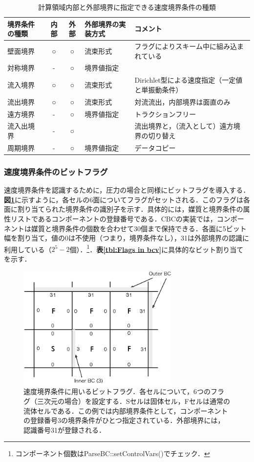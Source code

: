 \begin{table}[htdp]
\small
\caption{計算領域内部と外部境界に指定できる速度境界条件の種類}
\begin{center}
\begin{tabular}{l|cc|ll} \toprule
境界条件の種類 & 内部 & 外部 & 外部境界の実装方式 & コメント\\ \midrule
壁面境界 & ○ & ○ & 流束形式 & フラグによりスキーム中に組み込まれている\\
対称境界 & - & ○ & 境界値指定 &\\
流入境界 & ○ & ○ & 流束形式 & Dirichlet型による速度指定（一定値と単振動条件）\\
流出境界 & ○ & ○ & 流束形式 & 対流流出，内部境界は面直のみ\\
遠方境界 & - & ○ & 境界値指定 & トラクションフリー\\
流入出境界 & - & ○ &  & 流出境界と，（流入として）遠方境界の切り替え\\
周期境界 & - & ○ & 境界値指定 & データコピー\\ \bottomrule
\end{tabular}
\end{center}
\label{tbl:BCs of velocity}
\end{table}

%
\subsubsection{速度境界条件のビットフラグ}
速度境界条件を認識するために，圧力の場合と同様にビットフラグを導入する．\textbf{図\ref{fig:bit flag V}}に示すように，各セルの6面についてフラグがセットされる．このフラグは各面に割り当てられた境界条件の識別子を示す．具体的には，媒質と境界条件の属性リストであるコンポーネントの登録番号である．CBCの実装では，コンポーネントは媒質と境界条件の個数を合わせて30個まで保持できる．各面に5ビット幅を割り当て，値の0は不使用（つまり，境界条件なし），31は外部境界の認識に利用している（$2^5-2$個）．\footnote{コンポーネント個数はParseBC::setControlVars()でチェック．}．\textbf{表\ref{tbl:Flags in bcv}}に具体的なビット割り当てを示す．

\begin{figure}[htbp]
\begin{center}
\includegraphics[width=8cm,clip]{bit_flag_V.eps}
\end{center}
\caption{速度境界条件に用いるビットフラグ．各セルについて，6つのフラグ（三次元の場合）を設定する．Sセルは固体セル，Fセルは通常の流体セルである．この例では内部境界条件として，コンポーネントの登録番号3の境界条件がひとつ指定されている．外部境界には，認識番号31が登録される．}
\label{fig:bit flag V}
\end{figure}

